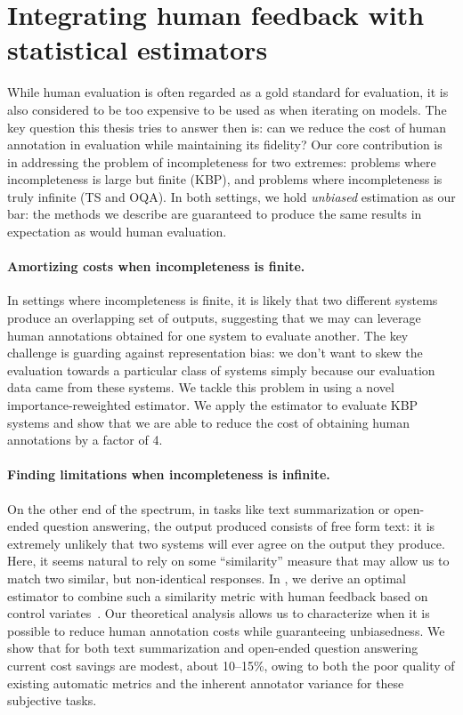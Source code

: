 
\section{Integrating human feedback with statistical estimators}
While human evaluation is often regarded as a gold standard for evaluation, it is also considered to be too expensive to be used as when iterating on models.
The key question this thesis tries to answer then is: can we reduce the cost of human annotation in evaluation while maintaining its fidelity?
Our core contribution is in addressing the problem of incompleteness for two extremes: problems where incompleteness is large but finite (KBP), and problems where incompleteness is truly infinite (TS and OQA).
In both settings, we hold \textit{unbiased} estimation as our bar: the methods we describe are guaranteed to produce the same results in expectation as would human evaluation.

\paragraph{Amortizing costs when incompleteness is finite.}
In settings where incompleteness is finite, it is likely that two different systems produce an overlapping set of outputs, suggesting that we may can leverage human annotations obtained for one system to evaluate another.
The key challenge is guarding against representation bias: we don't want to skew the evaluation towards a particular class of systems simply because our evaluation data came from these systems.
We tackle this problem in  using a novel importance-reweighted estimator. We apply the estimator to evaluate KBP systems and show that we are able to reduce the cost of obtaining human annotations by a factor of 4.

\paragraph{Finding limitations when incompleteness is infinite.}
On the other end of the spectrum, in tasks like text summarization or open-ended question answering, the output produced consists of free form text: it  is extremely unlikely that two systems will ever agree on the output they produce.
Here, it seems natural to rely on some ``similarity'' measure that may allow us to match two similar, but non-identical responses.
In , we derive an optimal estimator to combine such a similarity metric with human feedback based on control variates~\citep{owen2013monte}.
Our theoretical analysis allows us to characterize when it is possible to reduce human annotation costs while guaranteeing unbiasedness.
We show that for both text summarization and open-ended question answering current cost savings are modest, about 10--15\%, owing to both the poor quality of existing automatic metrics and the inherent annotator variance for these subjective tasks.

